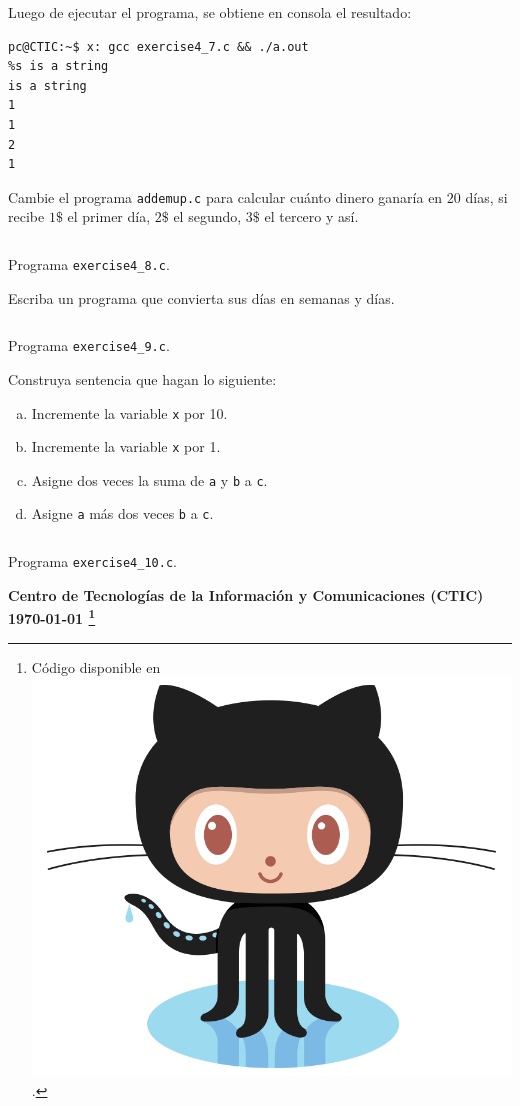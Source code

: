 \documentclass[spanish,addpoints,answers,a4paper]{exam}
\newcommand{\unmarkedfntext}[1]{%
	\begingroup
	\renewcommand\thefootnote{}\footnote{#1}%
	\addtocounter{footnote}{-1}%
	\endgroup
}
\newcommand{\mychar}{%
	\begingroup\normalfont
	\includegraphics[height=\fontcharht\font`\B]{Octocat.png}%
	\endgroup
}
\begin{document}
\begin{questions}
\begin{solution}
Luego de ejecutar el programa, se obtiene en consola el resultado:

\begin{verbatim}
pc@CTIC:~$ x: gcc exercise4_7.c && ./a.out
%s is a string
is a string
1
1
2
1
\end{verbatim}

\end{solution}

\question Cambie el programa \texttt{addemup.c} para calcular cuánto dinero ganaría en $20$ días, si recibe $1\$$ el primer día, $2\$$ el segundo, $3\$$ el tercero y así.

\begin{solution}

\begin{listing}[H]
	\footnotesize
	\inputminted{c}{exercise4_8.c}
	\caption{Programa \texttt{exercise4\_8.c}.}
	\label{lst:4.8}
\end{listing}
\end{solution}

\question Escriba un programa que convierta sus días en semanas y días.

\begin{solution}

\begin{listing}[H]
	\footnotesize
	\inputminted{c}{exercise4_9.c}
	\caption{Programa \texttt{exercise4\_9.c}.}
	\label{lst:4.9}
\end{listing}
\end{solution}

\question Construya sentencia que hagan lo siguiente:

\begin{enumerate}[a.]
	\item Incremente la variable \texttt{x} por 10.
	\item Incremente la variable \texttt{x} por 1.
	\item Asigne dos veces la suma de \texttt{a} y \texttt{b} a \texttt{c}.
	\item Asigne \texttt{a} más dos veces \texttt{b} a \texttt{c}.
\end{enumerate}

\begin{solution}

\begin{listing}[H]
	\footnotesize
	\inputminted{c}{exercise4_10.c}
	\caption{Programa \texttt{exercise4\_10.c}.}
	\label{lst:4.10}
\end{listing}
\end{solution}

\end{questions}

\begin{flushright}\bfseries
Centro de Tecnologías de la Información y Comunicaciones (CTIC)\\[2mm]
\today\unmarkedfntext{Código disponible en \href{https://github.com/carlosal1015/C-Programming}{\mychar{}}.}
\end{flushright}
\end{document}
